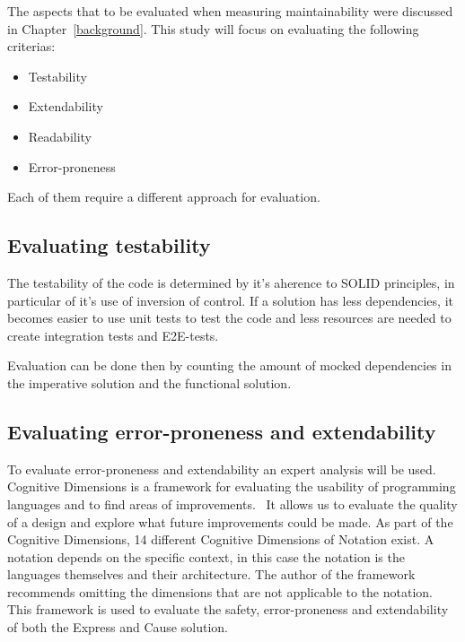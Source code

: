 The aspects that to be evaluated when measuring maintainability were discussed
in Chapter~\ref{background}. This study will focus on evaluating the following
criterias:

\begin{itemize}
    \item Testability
    \item Extendability
    \item Readability
    \item Error-proneness
\end{itemize}

Each of them require a different approach for evaluation.

\subsection{Evaluating testability}

The testability of the code is determined by it's aherence to SOLID principles,
in particular of it's use of inversion of control. If a solution has less
dependencies, it becomes easier to use unit tests to test the code and less
resources are needed to create integration tests and E2E-tests.

Evaluation can be done then by counting the amount of mocked dependencies in the
imperative solution and the functional solution.

\subsection{Evaluating error-proneness and extendability}

To evaluate error-proneness and extendability an expert analysis will be used.
Cognitive Dimensions is a framework for evaluating the usability of programming
languages and to find areas of improvements.~\cite{GREEN1996131} It allows us to
evaluate the quality of a design and explore what future improvements could be
made. As part of the Cognitive Dimensions, 14 different Cognitive Dimensions of
Notation exist. A notation depends on the specific context, in this case the
notation is the languages themselves and their architecture. The author of the
framework recommends omitting the dimensions that are not applicable to the
notation. This framework is used to evaluate the safety, error-proneness and
extendability of both the Express and Cause solution.

